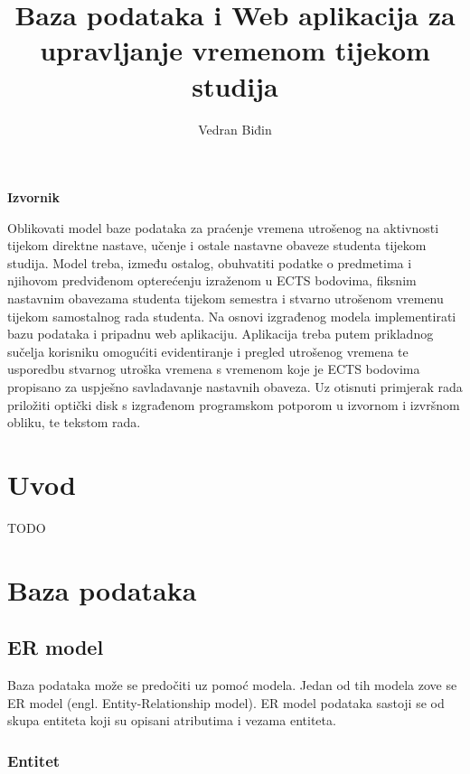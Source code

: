 \documentclass[times, utf8, zavrsni]{fer}
\begin{document}

\title{Baza podataka i Web aplikacija za upravljanje vremenom tijekom studija}

\author{Vedran Biđin}

\maketitle

\textbf{Izvornik}\\\hspace*{\fill}

Oblikovati model baze podataka za praćenje vremena utrošenog na aktivnosti tijekom direktne nastave, učenje i ostale nastavne obaveze studenta tijekom studija. Model treba, između ostalog, obuhvatiti podatke o predmetima i njihovom predviđenom opterećenju izraženom u ECTS bodovima, fiksnim nastavnim obavezama studenta tijekom semestra i stvarno utrošenom vremenu tijekom samostalnog rada studenta. Na osnovi izgrađenog modela implementirati bazu podataka i pripadnu web aplikaciju. Aplikacija treba putem prikladnog sučelja korisniku omogućiti evidentiranje i pregled utrošenog vremena te usporedbu stvarnog utroška vremena s vremenom koje je ECTS bodovima propisano za uspješno savladavanje nastavnih obaveza. Uz otisnuti primjerak rada priložiti optički disk s izgrađenom programskom potporom u izvornom i izvršnom obliku, te tekstom rada.

\zahvala{}

\tableofcontents

\chapter{Uvod}
TODO

\chapter{Baza podataka}

\section{ER model}

Baza podataka može se predočiti uz pomoć modela. Jedan od tih modela zove se ER model (engl. Entity-Relationship model). ER model podataka sastoji se od skupa entiteta koji su opisani atributima i vezama entiteta. 

\subsection{Entitet}
\end{document}
